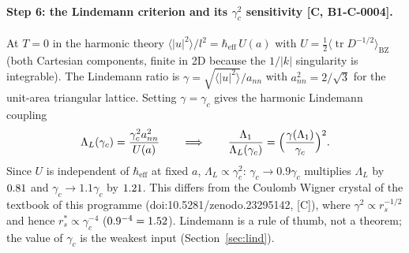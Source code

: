 \documentclass[10pt]{article}
\newcommand{\tier}[1]{\textsf{[#1]}}
\newcommand{\hb}{\hbar_{\mathrm{eff}}}
\newcommand{\tr}{\operatorname{tr}}
\begin{document}
\paragraph{Step 6: the Lindemann criterion and its $\gamma_c^2$ sensitivity \tier{C, B1-C-0004}.} At $T=0$ in the harmonic theory $\langle|u|^2\rangle/l^2=\hb\,U(a)$ with $U=\tfrac12\langle\tr D^{-1/2}\rangle_{\mathrm{BZ}}$ (both Cartesian components, finite
in 2D because the $1/|k|$ singularity is integrable). The Lindemann ratio is $\gamma=\sqrt{\langle|u|^2\rangle}/a_{nn}$ with $a_{nn}^2=2/\sqrt3$ for the unit-area triangular lattice. Setting $\gamma=\gamma_c$ gives the harmonic Lindemann coupling
\[\Lambda_L(\gamma_c)=\frac{\gamma_c^2a_{nn}^2}{U(a)}\qquad\Longrightarrow\qquad \frac{\Lambda_1}{\Lambda_L(\gamma_c)}=\Bigl(\frac{\gamma(\Lambda_1)}{\gamma_c}\Bigr)^2 .\]
Since $U$ is independent of $\hb$ at fixed $a$, $\Lambda_L\propto\gamma_c^2$: $\gamma_c\to0.9\gamma_c$ multiplies $\Lambda_L$ by $0.81$ and $\gamma_c\to1.1\gamma_c$ by $1.21$. This differs from the Coulomb Wigner crystal of the textbook of this programme
(doi:10.5281/zenodo.23295142, \tier{C}), where $\gamma^2\propto r_s^{-1/2}$ and hence $r_s^*\propto\gamma_c^{-4}$ ($0.9^{-4}=1.52$). Lindemann is a rule of thumb, not a theorem; the value of $\gamma_c$ is the weakest input (Section~\ref{sec:lind}).
\end{document}
